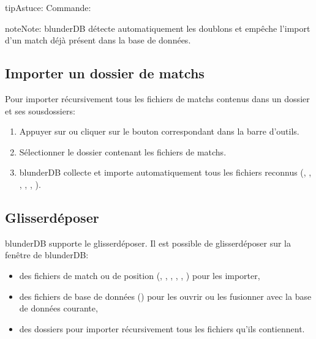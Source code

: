 \documentclass[letterpaper,10pt,french]{sphinxmanual}
\begin{document}
\begin{sphinxadmonition}{tip}{Astuce:}
\sphinxAtStartPar
Commande: 
\end{sphinxadmonition}

\begin{sphinxadmonition}{note}{Note:}
\sphinxAtStartPar
blunderDB détecte automatiquement les doublons et empêche l’import d’un
match déjà présent dans la base de données.
\end{sphinxadmonition}


\subsection{Importer un dossier de matchs}
\label{\detokenize{guide_utilisateur:importer-un-dossier-de-matchs}}
\sphinxAtStartPar
Pour importer récursivement tous les fichiers de matchs contenus dans un
dossier et ses sous\sphinxhyphen{}dossiers:
\begin{enumerate}
%
\item {} 
\sphinxAtStartPar
Appuyer sur  ou cliquer sur le bouton correspondant dans la
barre d’outils.

\item {} 
\sphinxAtStartPar
Sélectionner le dossier contenant les fichiers de matchs.

\item {} 
\sphinxAtStartPar
blunderDB collecte et importe automatiquement tous les fichiers reconnus
(, , , , , ).

\end{enumerate}


\subsection{Glisser\sphinxhyphen{}déposer}
\label{\detokenize{guide_utilisateur:glisser-deposer}}
\sphinxAtStartPar
blunderDB supporte le glisser\sphinxhyphen{}déposer. Il est possible de glisser\sphinxhyphen{}déposer
sur la fenêtre de blunderDB:
\begin{itemize}
\item {} 
\sphinxAtStartPar
des fichiers de match ou de position (, , , , , )
pour les importer,

\item {} 
\sphinxAtStartPar
des fichiers de base de données () pour les ouvrir ou les fusionner
avec la base de données courante,

\item {} 
\sphinxAtStartPar
des dossiers pour importer récursivement tous les fichiers qu’ils contiennent.

\end{itemize}
\end{document}
